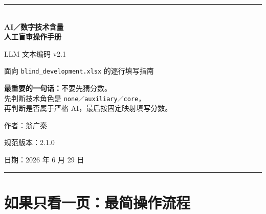 \documentclass[11pt,a4paper,fontset=none]{ctexart}
\begin{document}
\hypersetup{pageanchor=false}

\begin{titlepage}
  \centering
  \vspace*{2.0cm}
  {\color{navy}\rule{\textwidth}{1.4pt}}\\[1.3cm]
  {\Huge\bfseries AI／数字技术含量\\[0.25cm]人工盲审操作手册}\par
  \vspace{0.6cm}
  {\LARGE LLM 文本编码 v2.1}\par
  \vspace{1.1cm}
  {\large 面向 \texttt{blind\_development.xlsx} 的逐行填写指南}\par
  \vspace{1.5cm}
  \begin{tcolorbox}[width=0.84\textwidth,colback=yellow,colframe=navy,boxrule=0.9pt,arc=2mm]
    \centering\large
    \textbf{最重要的一句话：}不要先猜分数。\\[0.25cm]
    先判断技术角色是 \texttt{none／auxiliary／core}，\\
    再判断是否属于严格 AI，最后按固定映射填写分数。
  \end{tcolorbox}
  \vfill
  {\large 作者：翁广秦}\par
  \vspace{0.25cm}
  {\large 规范版本：2.1.0}\par
  \vspace{0.25cm}
  {\large 日期：2026 年 6 月 29 日}\par
  \vspace{1.0cm}
  {\color{navy}\rule{\textwidth}{1.4pt}}
\end{titlepage}
\hypersetup{pageanchor=true}
\setcounter{page}{1}

\tableofcontents
\clearpage
{}

\section{如果只看一页：最简操作流程}
\end{document}
